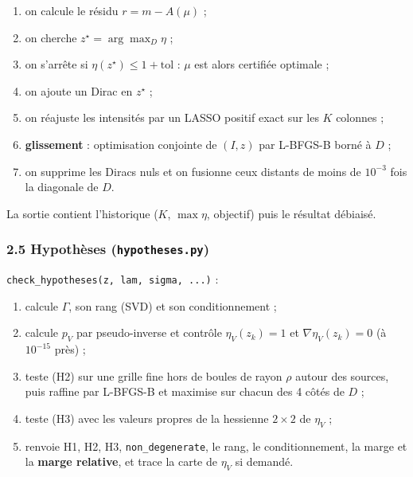 \documentclass[
  french,
]{article}
\providecommand{\tightlist}{%
  \setlength{\itemsep}{0pt}\setlength{\parskip}{0pt}}
\begin{document}
\begin{enumerate}
\def\labelenumi{\arabic{enumi}.}
\tightlist
\item
  on calcule le résidu \(r = m - A(\mu)\) ;
\item
  on cherche \(z^{\star} = \arg\max_D \eta\) ;
\item
  on s'arrête si \(\eta(z^{\star})\le 1 + \mathrm{tol}\) : \(\mu\) est
  alors certifiée optimale ;
\item
  on ajoute un Dirac en \(z^{\star}\) ;
\item
  on réajuste les intensités par un LASSO positif exact sur les \(K\)
  colonnes ;
\item
  \textbf{glissement} : optimisation conjointe de \((I, z)\) par
  L-BFGS-B borné à \(D\) ;
\item
  on supprime les Diracs nuls et on fusionne ceux distants de moins de
  \(10^{-3}\) fois la diagonale de \(D\).
\end{enumerate}

La sortie contient l'historique (\(K\), \(\max\eta\), objectif) puis le
résultat débiaisé.

\subsubsection{\texorpdfstring{2.5 Hypothèses
(\texttt{hypotheses.py})}{2.5 Hypothèses (hypotheses.py)}}\label{hypothuxe8ses-hypotheses.py}

\texttt{check\_hypotheses(z,\ lam,\ sigma,\ ...)} :

\begin{enumerate}
\def\labelenumi{\arabic{enumi}.}
\tightlist
\item
  calcule \(\Gamma\), son rang (SVD) et son conditionnement ;
\item
  calcule \(p_V\) par pseudo-inverse et contrôle \(\eta_V(z_k) = 1\) et
  \(\nabla\eta_V(z_k) = 0\) (à \(10^{-15}\) près) ;
\item
  teste (H2) sur une grille fine hors de boules de rayon \(\rho\) autour
  des sources, puis raffine par L-BFGS-B et maximise sur chacun des 4
  côtés de \(D\) ;
\item
  teste (H3) avec les valeurs propres de la hessienne \(2\times 2\) de
  \(\eta_V\) ;
\item
  renvoie H1, H2, H3, \texttt{non\_degenerate}, le rang, le
  conditionnement, la marge et la \textbf{marge relative}, et trace la
  carte de \(\eta_V\) si demandé.
\end{enumerate}
\end{document}
